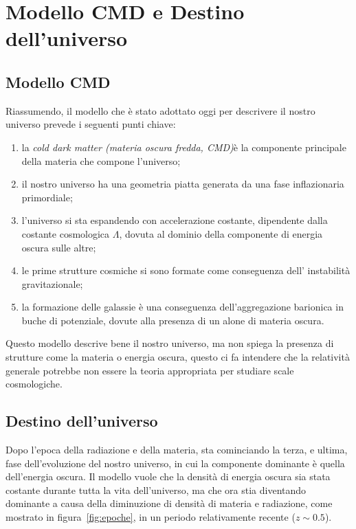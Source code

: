 \section{Modello CMD e Destino dell'universo}\label{sec:modello-CDM-destino}

\subsection{Modello CMD}\label{sec:modello-CDM}
Riassumendo, il modello che è stato adottato oggi per descrivere il nostro universo prevede i seguenti punti chiave:
\begin{enumerate}
    \item la \textit{cold dark matter (materia oscura fredda, CMD)}è la componente principale della materia che compone l'universo;
    \item il nostro universo ha una geometria piatta generata da una fase inflazionaria primordiale;
    \item l'universo si sta espandendo con accelerazione costante, dipendente dalla costante cosmologica $\Lambda$, dovuta al dominio della componente di energia oscura sulle altre;
    \item le prime strutture cosmiche si sono formate come conseguenza dell' instabilità gravitazionale;
    \item la formazione delle galassie è una conseguenza dell'aggregazione barionica in buche di potenziale, dovute alla presenza di un alone di materia oscura.
\end{enumerate}

Questo modello descrive bene il nostro universo, ma non spiega la presenza di strutture come la materia o energia oscura, questo ci fa intendere che la relatività generale potrebbe non essere la teoria appropriata per studiare scale cosmologiche.

\subsection{Destino dell'universo}\label{sec:destino}

Dopo l'epoca della radiazione e della materia, sta cominciando la terza, e ultima, fase dell'evoluzione del nostro universo, in cui la componente dominante è quella dell'energia oscura. Il modello vuole che la densità di energia oscura sia stata costante durante tutta la vita dell'universo, ma che ora stia diventando dominante a causa della diminuzione di densità di materia e radiazione, come mostrato in figura~\ref{fig:epoche}, in un periodo relativamente recente ($z \sim 0.5$).

